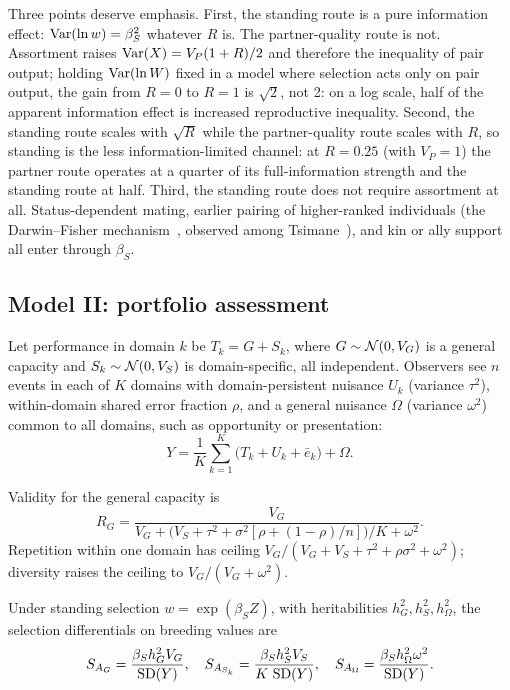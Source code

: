 Three points deserve emphasis. First, the standing route is a pure information effect: $\operatorname{Var}(\ln w)=\beta_S^2$ whatever $R$
is. The partner-quality route is not. Assortment raises $\operatorname{Var}(X)=V_P(1+R)/2$ and therefore the inequality of pair output;
holding $\operatorname{Var}(\ln W)$ fixed in a model where selection acts only on pair output, the gain from $R=0$ to $R=1$ is $\sqrt2$,
not 2: on a log scale, half of the apparent information effect is increased reproductive inequality. Second, the standing route scales with
$\sqrt{R}$ while the partner-quality route scales with $R$, so standing is the less information-limited channel: at $R=0.25$
(with $V_P=1$) the partner route operates at a quarter of its full-information strength and the standing route at half. Third,
the standing route does not require assortment at all. Status-dependent mating, earlier pairing of higher-ranked
individuals (the Darwin--Fisher mechanism~\cite{kirkpatrick1990}, observed among Tsimane~\cite{vonrueden2011}), and kin or ally
support all enter through $\beta_S$.

\subsection{Model II: portfolio assessment}\label{sec:portfolio}

Let performance in domain $k$ be $T_k=G+S_k$, where $G\sim\mathcal{N}(0,V_G)$ is a general capacity and $S_k\sim\mathcal{N}(0,V_S)$ is
domain-specific, all independent. Observers see $n$ events in each of $K$ domains with domain-persistent nuisance $U_k$
(variance $\tau^2$), within-domain shared error fraction $\rho$, and a general nuisance $\Omega$ (variance $\omega^2$) common
to all domains, such as opportunity or presentation:
\begin{equation}
Y=\frac1K\sum_{k=1}^K\big(T_k+U_k+\bar e_k\big)+\Omega.\label{eq:portfolio}
\end{equation}

\begin{proposition}\label{prop:portfolio}
Validity for the general capacity is
\begin{equation}
R_G=\frac{V_G}{V_G+\big(V_S+\tau^2+\sigma^2[\rho+(1-\rho)/n]\big)/K+\omega^2}.\label{eq:RG}
\end{equation}
Repetition within one domain has ceiling $V_G/(V_G+V_S+\tau^2+\rho\sigma^2+\omega^2)$; diversity raises the ceiling to
$V_G/(V_G+\omega^2)$.
\end{proposition}

\begin{proposition}\label{prop:diversity}
Under standing selection $w=\exp(\beta_SZ)$, with heritabilities $h_G^2,h_S^2,h_\Omega^2$, the selection differentials on
breeding values are
\begin{equation}
S_{A_G}=\frac{\beta_Sh_G^2V_G}{\operatorname{SD}(Y)},\quad S_{A_{S_k}}=\frac{\beta_Sh_S^2V_S}{K\,\operatorname{SD}(Y)},\quad
S_{A_\Omega}=\frac{\beta_Sh_\Omega^2\omega^2}{\operatorname{SD}(Y)}.\label{eq:diversity}
\end{equation}
\end{proposition}

